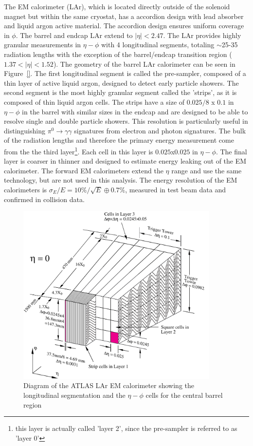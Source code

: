 The EM calorimeter (LAr), which is located directly outside of the solenoid magnet but within the same cryostat, has a accordion design with lead absorber and liquid argon active material. The accordion design ensures uniform coverage in $\phi$. The barrel and endcap LAr extend to $|\eta| < 2.47$. The LAr provides highly granular measurements in $\eta-\phi$ with 4 longitudinal segments, totaling $\sim$25-35 radiation lengths with the exception of the barrel/endcap transition region ($1.37<|\eta|<1.52$).  The geometry of the barrel LAr calorimeter can be seen in Figure~\ref{}. The first longitudinal segment is called the pre-sampler, composed of a thin layer of active liquid argon, designed to detect early particle showers. The second segment is the most highly granular segment called the 'strips', as it is composed of thin liquid argon cells. The strips have a size of $0.025/8$ x $0.1$ in $\eta-\phi$ in the barrel with similar sizes in the endcap and are designed to be able to resolve single and double particle showers. This resolution is particularly useful in distinguishing $\pi^0\rightarrow\gamma\gamma$ signatures from electron and photon signatures. The bulk of the radiation lengths and therefore the primary energy measurement come from the the third layer\footnote{this layer is actually called 'layer 2', since the pre-sampler is referred to as 'layer 0'}. Each cell in this layer is $0.025$x$0.025$ in $\eta-\phi$. The final layer is coarser in thinner and designed to estimate energy leaking out of the EM calorimeter. The forward EM calorimeters extend the $\eta$ range and use the same technology, but are not used in this analysis. The energy resolution of the EM calorimeters is $\sigma_E/E = 10\%/\sqrt{E}\oplus0.7\%$, measured in test beam data and confirmed in collision data. 

\begin{figure}[!t]
\centering 
\includegraphics[width=0.9\textwidth]{figs/lhc/LARG3-TDR-barrelM-eps-converted-to}
\caption{Diagram of the ATLAS  LAr EM calorimeter showing the longitudinal segmentation and the $\eta-\phi$ cells for the central barrel region}
\label{figure:lhc_calo_em}
\end{figure}




